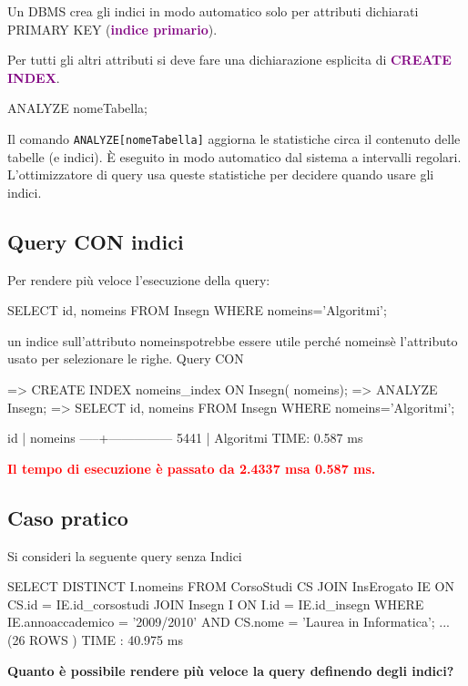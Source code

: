 Un DBMS crea gli indici in modo automatico solo per attributi dichiarati PRIMARY KEY (\textcolor{purple}{\textbf{indice primario}}).

Per tutti gli altri attributi si deve fare una dichiarazione esplicita di \textcolor{purple}{\textbf{CREATE INDEX}}.

\begin{codiceSQL}
  ANALYZE nomeTabella;
\end{codiceSQL}

Il comando \texttt{ANALYZE[nomeTabella]} aggiorna le statistiche circa il contenuto delle tabelle (e indici). È eseguito in modo automatico dal sistema a intervalli regolari.
L’ottimizzatore di query usa queste statistiche per decidere quando usare gli indici.

\subsection*{Query CON indici}

Per rendere più veloce l’esecuzione della query:
\begin{codiceSQL}
SELECT id, nomeins FROM Insegn WHERE nomeins='Algoritmi';
\end{codiceSQL}
un indice sull’attributo nomeinspotrebbe essere utile perché nomeinsè l’attributo usato per selezionare le righe.
Query CON

\begin{codiceSQL}
  => CREATE INDEX nomeins_index ON Insegn( nomeins);
=> ANALYZE Insegn;
=> SELECT id, nomeins FROM Insegn WHERE nomeins='Algoritmi';

id | nomeins
-----+---------------
5441 | Algoritmi
TIME: 0.587 ms
\end{codiceSQL}
\textcolor{red}{\textbf{Il tempo di esecuzione è passato da 2.4337 msa 0.587 ms.}}


\subsection{Caso pratico}

Si consideri la seguente query senza Indici

\begin{codiceSQL}
SELECT DISTINCT I.nomeins
FROM CorsoStudi CS
JOIN InsErogato IE ON CS.id = IE.id_corsostudi
JOIN Insegn I ON I.id = IE.id_insegn
WHERE IE.annoaccademico = '2009/2010'
AND CS.nome = 'Laurea in Informatica';
...
(26 ROWS )
TIME : 40.975 ms
\end{codiceSQL}
\textcolor{black!60!red}{\textbf{Quanto è possibile rendere più veloce la query definendo degli indici?}}

